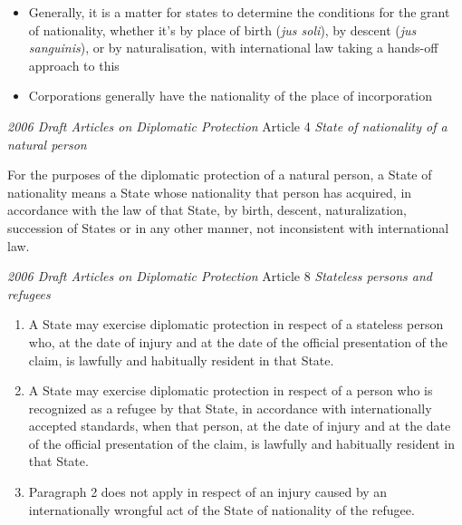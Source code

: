 \begin{itemize}
    \item Generally, it is a matter for states to determine the conditions for the grant of nationality, whether it's by place of birth (\textit{jus soli}), by descent (\textit{jus sanguinis}), or by naturalisation, with international law taking a hands-off approach to this
    \item Corporations generally have the nationality of the place of incorporation
\end{itemize}

\begin{conventiondetails}{\textit{2006 Draft Articles on Diplomatic Protection} Article 4}
    \flushleft
    \textit{State of nationality of a natural person}

    \vspace{\baselineskip}

    For the purposes of the diplomatic protection of a natural person, a State of nationality means a State whose nationality that person has acquired, in accordance with the law of that State, by birth, descent, naturalization, succession of States or in any other manner, not inconsistent with international law.
\end{conventiondetails}

\begin{conventiondetails}{\textit{2006 Draft Articles on Diplomatic Protection} Article 8}
    \flushleft
    \textit{Stateless persons and refugees}

    \begin{enumerate}
        \item A State may exercise diplomatic protection in respect of a stateless person who, at the date of injury and at the date of the official presentation of the claim, is lawfully and habitually resident in that State.
        \item A State may exercise diplomatic protection in respect of a person who is recognized as a refugee by that State, in accordance with internationally accepted standards, when that person, at the date of injury and at the date of the official presentation of the claim, is lawfully and habitually resident in that State.
        \item Paragraph 2 does not apply in respect of an injury caused by an internationally wrongful act of the State of nationality of the refugee.
    \end{enumerate}
\end{conventiondetails}

